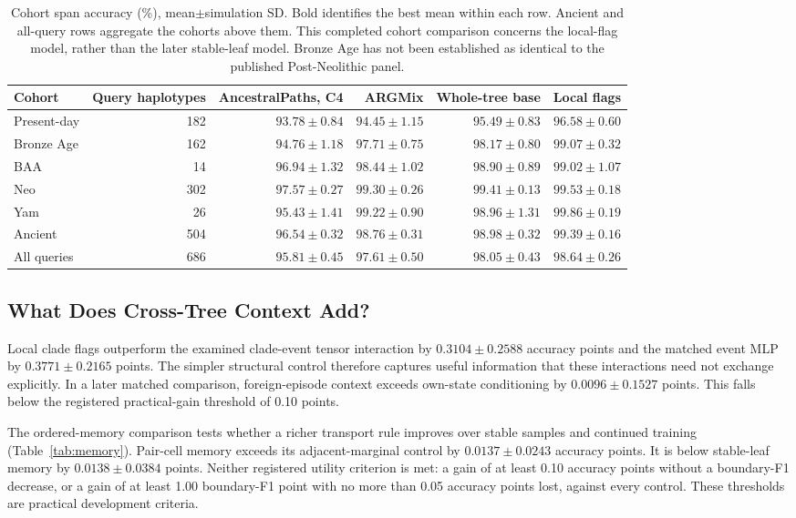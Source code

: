 \documentclass[letterpaper]{article}
\newcommand{\best}[1]{\mathbf{#1}}
\begin{document}
\begin{table}[t]
\centering
\small
\begin{tabular}{@{}lrrrrr@{}}
\toprule
Cohort & Query haplotypes & AncestralPaths, C4 & ARGMix & Whole-tree base & Local flags\\
\midrule
Present-day &182&$93.78\pm0.84$&$94.45\pm1.15$&$95.49\pm0.83$&$\best{96.58\pm0.60}$\\
Bronze Age &162&$94.76\pm1.18$&$97.71\pm0.75$&$98.17\pm0.80$&$\best{99.07\pm0.32}$\\
BAA &14&$96.94\pm1.32$&$98.44\pm1.02$&$98.90\pm0.89$&$\best{99.02\pm1.07}$\\
Neo &302&$97.57\pm0.27$&$99.30\pm0.26$&$99.41\pm0.13$&$\best{99.53\pm0.18}$\\
Yam &26&$95.43\pm1.41$&$99.22\pm0.90$&$98.96\pm1.31$&$\best{99.86\pm0.19}$\\
Ancient &504&$96.54\pm0.32$&$98.76\pm0.31$&$98.98\pm0.32$&$\best{99.39\pm0.16}$\\
All queries &686&$95.81\pm0.45$&$97.61\pm0.50$&$98.05\pm0.43$&$\best{98.64\pm0.26}$\\
\bottomrule
\end{tabular}
\caption{Cohort span accuracy (\%), mean$\pm$simulation SD. Bold identifies the best mean within each row. Ancient and all-query rows aggregate the cohorts above them. This completed cohort comparison concerns the local-flag model, rather than the later stable-leaf model. Bronze Age has not been established as identical to the published Post-Neolithic panel.}
\label{tab:cohorts}
\end{table}

\subsection{What Does Cross-Tree Context Add?}
Local clade flags outperform the examined clade-event tensor interaction by $0.3104\pm0.2588$ accuracy points and the matched event MLP by $0.3771\pm0.2165$ points. The simpler structural control therefore captures useful information that these interactions need not exchange explicitly. In a later matched comparison, foreign-episode context exceeds own-state conditioning by $0.0096\pm0.1527$ points. This falls below the registered practical-gain threshold of 0.10 points.

The ordered-memory comparison tests whether a richer transport rule improves over stable samples and continued training (Table~\ref{tab:memory}). Pair-cell memory exceeds its adjacent-marginal control by $0.0137\pm0.0243$ accuracy points. It is below stable-leaf memory by $0.0138\pm0.0384$ points. Neither registered utility criterion is met: a gain of at least 0.10 accuracy points without a boundary-F1 decrease, or a gain of at least 1.00 boundary-F1 point with no more than 0.05 accuracy points lost, against every control. These thresholds are practical development criteria.
\end{document}
